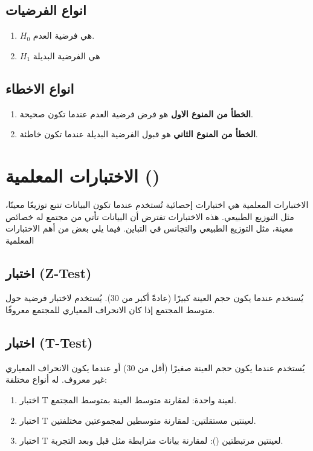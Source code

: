 \subsection{انواع الفرضيات}

\begin{enumerate}
	\item $H_0$ هي فرضية العدم.
	\item $H_1$ هي الفرضية البديلة
\end{enumerate}

\subsection{انواع الاخطاء}
\begin{enumerate}
	\item \textbf{الخطأ من المنوع الاول} هو فرض فرضية العدم عندما تكون صحيحة.
	\item \textbf{الخطأ من المنوع الثاني} هو قبول الفرضية البديلة عندما تكون خاطئة.
\end{enumerate}

\section{الاختبارات المعلمية  ()}
الاختبارات المعلمية هي اختبارات إحصائية تُستخدم عندما تكون البيانات تتبع توزيعًا معينًا، مثل التوزيع الطبيعي. هذه الاختبارات تفترض أن البيانات تأتي من مجتمع له خصائص معينة، مثل التوزيع الطبيعي والتجانس في التباين. فيما يلي بعض من أهم الاختبارات المعلمية

\subsection{اختبار (Z-Test)}
يُستخدم عندما يكون حجم العينة كبيرًا (عادةً أكبر من 30).
يُستخدم لاختبار فرضية حول متوسط المجتمع إذا كان الانحراف المعياري للمجتمع معروفًا.

\subsection{اختبار (T-Test)}
يُستخدم عندما يكون حجم العينة صغيرًا (أقل من 30) أو عندما يكون الانحراف المعياري غير معروف.
له أنواع مختلفة: 
\begin{enumerate}
\item  	اختبار T لعينة واحدة: لمقارنة متوسط العينة بمتوسط المجتمع.
\item  	اختبار T لعينتين مستقلتين: لمقارنة متوسطين لمجموعتين مختلفتين.
\item  	اختبار T لعينتين مرتبطتين (): لمقارنة بيانات مترابطة مثل قبل وبعد التجربة.
\end{enumerate}


